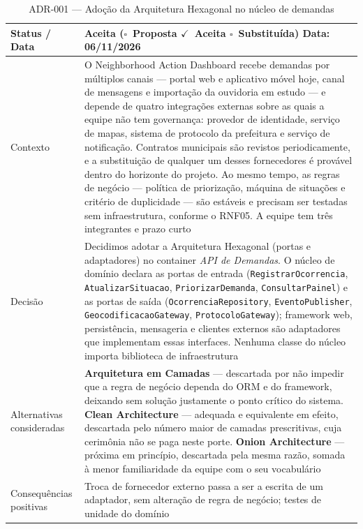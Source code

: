 \documentclass[12pt,a4paper,oneside]{article}
\newcommand{\cab}[1]{\textbf{\footnotesize #1}}
\newcommand{\marcado}{$\checkmark$}
\newcommand{\vazio}{$\square$}
\begin{document}
\begin{table}[H]
\centering
\caption{ADR-001 — Adoção da Arquitetura Hexagonal no núcleo de demandas}
\label{tab:adr}
{\small\singlespacing
\begin{tabularx}{\textwidth}{L{3.4cm} X}
\toprule
\cab{Status / Data} & \textbf{Aceita} \quad (\vazio\ Proposta \quad
\textbf{\marcado}\ Aceita \quad \vazio\ Substituída) \quad Data: 06/11/2026 \\
\midrule
Contexto & O Neighborhood Action Dashboard recebe demandas por múltiplos canais
— portal web e aplicativo móvel hoje, canal de mensagens e importação da
ouvidoria em estudo — e depende de quatro integrações externas sobre as quais a
equipe não tem governança: provedor de identidade, serviço de mapas, sistema de
protocolo da prefeitura e serviço de notificação. Contratos municipais são
revistos periodicamente, e a substituição de qualquer um desses fornecedores é
provável dentro do horizonte do projeto. Ao mesmo tempo, as regras de negócio —
política de priorização, máquina de situações e critério de duplicidade — são
estáveis e precisam ser testadas sem infraestrutura, conforme o RNF05. A equipe
tem três integrantes e prazo curto \\
\addlinespace
Decisão & Decidimos adotar a Arquitetura Hexagonal (portas e adaptadores) no
container \emph{API de Demandas}. O núcleo de domínio declara as portas de
entrada (\texttt{RegistrarOcorrencia}, \texttt{AtualizarSituacao},
\texttt{PriorizarDemanda}, \texttt{ConsultarPainel}) e as portas de saída
(\texttt{OcorrenciaRepository}, \texttt{EventoPublisher},
\texttt{GeocodificacaoGateway}, \texttt{ProtocoloGateway}); framework web,
persistência, mensageria e clientes externos são adaptadores que implementam
essas interfaces. Nenhuma classe do núcleo importa biblioteca de
infraestrutura \\
\addlinespace
Alternativas consideradas & \textbf{Arquitetura em Camadas} — descartada por não
impedir que a regra de negócio dependa do ORM e do framework, deixando sem
solução justamente o ponto crítico do sistema. \textbf{Clean Architecture} —
adequada e equivalente em efeito, descartada pelo número maior de camadas
prescritivas, cuja cerimônia não se paga neste porte. \textbf{Onion
Architecture} — próxima em princípio, descartada pela mesma razão, somada à
menor familiaridade da equipe com o seu vocabulário \\
\addlinespace
Consequências positivas & Troca de fornecedor externo passa a ser a escrita de
um adaptador, sem alteração de regra de negócio; testes de unidade do domínio

\end{tabularx}}
\end{table}
\end{document}
